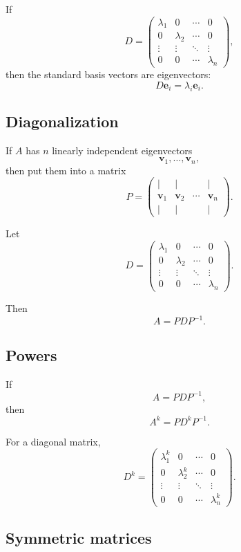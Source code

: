 If
\[
    D=
    \begin{pmatrix}
    \lambda_1&0&\cdots&0\\
    0&\lambda_2&\cdots&0\\
    \vdots&\vdots&\ddots&\vdots\\
    0&0&\cdots&\lambda_n
    \end{pmatrix},
\]
then the standard basis vectors are eigenvectors:
\[
\boxed{
    D\mathbf e_i=\lambda_i\mathbf e_i.
}
\]

\subsection*{Diagonalization}

If \(A\) has \(n\) linearly independent eigenvectors
\[
    \mathbf v_1,\ldots,\mathbf v_n,
\]
then put them into a matrix
\[
\boxed{
    P=
    \begin{pmatrix}
    |&|&&|\\
    \mathbf v_1&\mathbf v_2&\cdots&\mathbf v_n\\
    |&|&&|
    \end{pmatrix}.
}
\]

Let
\[
\boxed{
    D=
    \begin{pmatrix}
    \lambda_1&0&\cdots&0\\
    0&\lambda_2&\cdots&0\\
    \vdots&\vdots&\ddots&\vdots\\
    0&0&\cdots&\lambda_n
    \end{pmatrix}.
}
\]

Then
\[
\boxed{
    A=PDP^{-1}.
}
\]

\subsection*{Powers}

If
\[
    A=PDP^{-1},
\]
then
\[
\boxed{
    A^k=PD^kP^{-1}.
}
\]

For a diagonal matrix,
\[
\boxed{
    D^k=
    \begin{pmatrix}
    \lambda_1^k&0&\cdots&0\\
    0&\lambda_2^k&\cdots&0\\
    \vdots&\vdots&\ddots&\vdots\\
    0&0&\cdots&\lambda_n^k
    \end{pmatrix}.
}
\]

\subsection*{Symmetric matrices}

